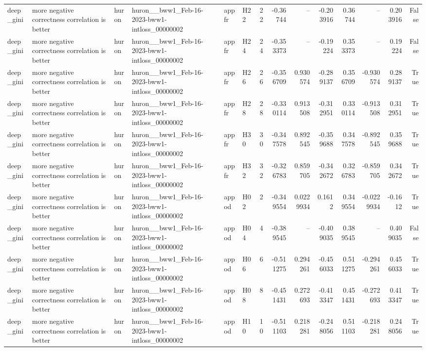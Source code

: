 \begin{longtable}{llllllrrrrrrrr}
deep\_gini & more negative correctness correlation is better & huron & huron\_\_bww1\_Feb-16-2023-bww1-intloss\_00000002 & appfr & H22 & 22 & -0.36744 & -- & -0.203916 & 0.36744 & -- & 0.203916 & False \\
deep\_gini & more negative correctness correlation is better & huron & huron\_\_bww1\_Feb-16-2023-bww1-intloss\_00000002 & appfr & H24 & 24 & -0.353373 & -- & -0.19224 & 0.353373 & -- & 0.19224 & False \\
deep\_gini & more negative correctness correlation is better & huron & huron\_\_bww1\_Feb-16-2023-bww1-intloss\_00000002 & appfr & H26 & 26 & -0.356709 & 0.930574 & -0.289137 & 0.356709 & -0.930574 & 0.289137 & True \\
deep\_gini & more negative correctness correlation is better & huron & huron\_\_bww1\_Feb-16-2023-bww1-intloss\_00000002 & appfr & H28 & 28 & -0.330114 & 0.913508 & -0.312951 & 0.330114 & -0.913508 & 0.312951 & True \\
deep\_gini & more negative correctness correlation is better & huron & huron\_\_bww1\_Feb-16-2023-bww1-intloss\_00000002 & appfr & H30 & 30 & -0.347578 & 0.892545 & -0.359688 & 0.347578 & -0.892545 & 0.359688 & True \\
deep\_gini & more negative correctness correlation is better & huron & huron\_\_bww1\_Feb-16-2023-bww1-intloss\_00000002 & appfr & H32 & 32 & -0.326783 & 0.859705 & -0.342672 & 0.326783 & -0.859705 & 0.342672 & True \\
deep\_gini & more negative correctness correlation is better & huron & huron\_\_bww1\_Feb-16-2023-bww1-intloss\_00000002 & appod & H02 & 2 & -0.349554 & 0.0229934 & 0.1612 & 0.349554 & -0.0229934 & -0.1612 & True \\
deep\_gini & more negative correctness correlation is better & huron & huron\_\_bww1\_Feb-16-2023-bww1-intloss\_00000002 & appod & H04 & 4 & -0.389545 & -- & -0.409035 & 0.389545 & -- & 0.409035 & False \\
deep\_gini & more negative correctness correlation is better & huron & huron\_\_bww1\_Feb-16-2023-bww1-intloss\_00000002 & appod & H06 & 6 & -0.511275 & 0.294261 & -0.456033 & 0.511275 & -0.294261 & 0.456033 & True \\
deep\_gini & more negative correctness correlation is better & huron & huron\_\_bww1\_Feb-16-2023-bww1-intloss\_00000002 & appod & H08 & 8 & -0.451431 & 0.272693 & -0.413347 & 0.451431 & -0.272693 & 0.413347 & True \\
deep\_gini & more negative correctness correlation is better & huron & huron\_\_bww1\_Feb-16-2023-bww1-intloss\_00000002 & appod & H10 & 10 & -0.511103 & 0.218281 & -0.248056 & 0.511103 & -0.218281 & 0.248056 & True \\

\end{longtable}
